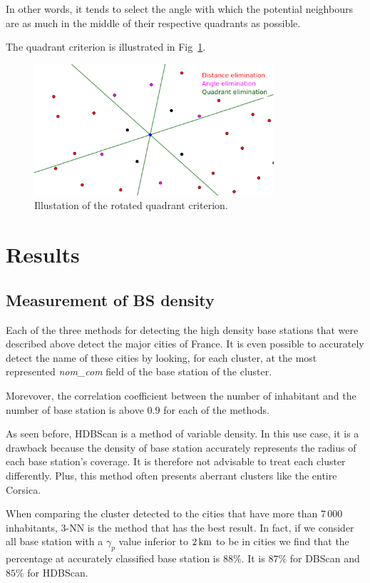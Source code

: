 \documentclass[lettersize,journal,english]{IEEEtran}
\begin{document}
            In other words, it tends to select the angle with which the potential neighbours are as much in the middle of their respective quadrants as possible.

            The quadrant criterion is illustrated in Fig~\ref{fig:crit_qua}.
            \begin{figure}
                \centering
                \includegraphics[width=3.5in]{images/illus_crit/quadrant_elim.png}
                \caption{Illustation of the rotated quadrant criterion.}
                \label{fig:crit_qua}
            \end{figure}

\section{Results\label{sec:res}}
    \subsection{Measurement of BS density}
        Each of the three methods for detecting the high density base stations that were described above detect the major cities of France. It is even possible to accurately detect the name of these cities by looking, for each cluster, at the most represented \textsl{nom\_com} field of the base station of the cluster.

        Morevover, the correlation coefficient between the number of inhabitant and the number of base station is above $0.9$ for each of the methods.

        As seen before, HDBScan is a method of variable density. In this use case, it is a drawback because the density of base station accurately represents the radius of each base station's coverage. It is therefore not advisable to treat each cluster differently. Plus, this method often presents aberrant clusters like the entire Corsica.

        When comparing the cluster detected to the cities that have more than $7\,000$ inhabitants, $3$-NN is the method that has the best result. In fact, if we consider all base station with a $\gamma_p$ value inferior to $\unit[2]{km}$ to be in cities we find that the percentage at accurately classified base station is $88\%$. It is $87\%$ for DBScan and $85\%$ for HDBScan.
\end{document}
